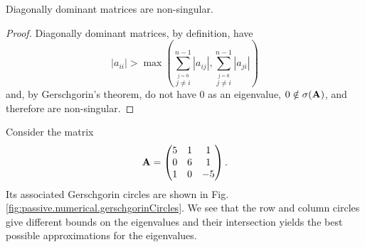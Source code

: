 \begin{corr}\label{corr:passive.numerical.diagDominantMatrices}
 Diagonally dominant matrices are non-singular.
\end{corr}

 \begin{proof}
  Diagonally dominant matrices, by definition, have 
    \begin{equation}
     |a_{ii}| > \max\left(\sum_{\stackrel{j=0}{j\neq i}}^{n-1} |a_{ij}|, \sum_{\stackrel{j=0}{j\neq i}}^{n-1} |a_{ji}|\right)
    \end{equation}
  and, by Gerschgorin's theorem, do not have 0 as an eigenvalue, $0\notin\sigma(\mathbf{A})$, and therefore are 
  non-singular.
 \end{proof}

\begin{exmp}
  Consider the matrix \cite[p.~499]{MEY2001}
  \begin{equation}
    \label{eq:passive.numerical.exampleMatrixGerschgorin}
    \mathbf{A} = \begin{pmatrix} 5 & 1 & 1 \\ 0 & 6 & 1 \\ 1 & 0 & -5 \end{pmatrix}.
  \end{equation}
  Its associated Gerschgorin circles are shown in Fig. \ref{fig:passive.numerical.gerschgorinCircles}. 
  We see that the row and column circles give different bounds on the eigenvalues and their intersection 
  yields the best possible approximations for the eigenvalues. 
\end{exmp}

